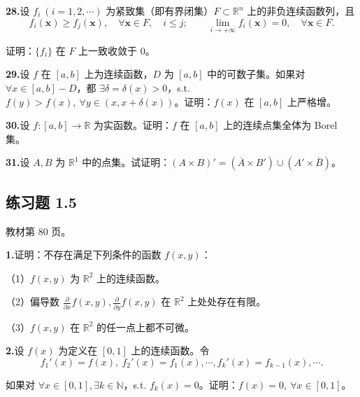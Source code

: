\documentclass[11pt,a4paper]{article}
\begin{document}
\par{}\noindent\textbf{28.}\quad 设 $f_i\ (i=1,2,\cdots)$ 为紧致集（即有界闭集）$F\subset\mathbb R^n$ 上的非负连续函数列，且
\[f_i(\boldsymbol{x})\geq f_j(\boldsymbol{x}),\quad \forall\boldsymbol{x}\in F,\quad i\leq j;\qquad \lim_{i\to+\infty}f_i(\boldsymbol{x})=0,\quad \forall\boldsymbol{x}\in F.\]
\par\noindent 证明：$\{f_i\}$ 在 $F$ 上一致收敛于 $0$。
\par{}\noindent\textbf{29.}\quad 设 $f$ 在 $[a,b]$ 上为连续函数，$D$ 为 $[a,b]$ 中的可数子集。如果对 $\forall x\in[a,b]-D$，都 $\exists\delta=\delta(x)>0$，s.t. $f(y)>f(x),\ \forall y\in(x,x+\delta(x))$。证明：$f(x)$ 在 $[a,b]$ 上严格增。
\par{}\noindent\textbf{30.}\quad 设 $f:[a,b]\to\mathbb R$ 为实函数。证明：$f$ 在 $[a,b]$ 上的连续点集全体为 Borel 集。
\par{}\noindent\textbf{31.}\quad 设 $A,B$ 为 $\mathbb R^1$ 中的点集。试证明：$(A\times B)'=(\overline A\times B')\cup(A'\times\overline B)$。

\subsection*{练习题 1.5}
\noindent 教材第 80 页。
\par{}\noindent\textbf{1.}\quad 证明：不存在满足下列条件的函数 $f(x,y)$：
\par\noindent （1）$f(x,y)$ 为 $\mathbb R^2$ 上的连续函数。
\par\noindent （2）偏导数 $\frac{\partial}{\partial x}f(x,y),\frac{\partial}{\partial y}f(x,y)$ 在 $\mathbb R^2$ 上处处存在有限。
\par\noindent （3）$f(x,y)$ 在 $\mathbb R^2$ 的任一点上都不可微。
\par{}\noindent\textbf{2.}\quad 设 $f(x)$ 为定义在 $[0,1]$ 上的连续函数。令
\[f_1'(x)=f(x),\ f_2'(x)=f_1(x),\cdots,f_k'(x)=f_{k-1}(x),\cdots.\]
\par\noindent 如果对 $\forall x\in[0,1],\exists k\in\mathbb N$，s.t. $f_k(x)=0$。证明：$f(x)=0,\ \forall x\in[0,1]$。
\end{document}
